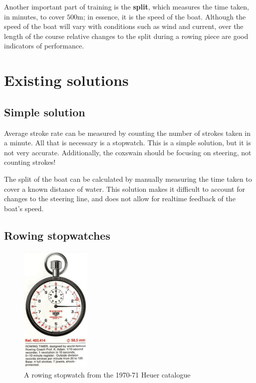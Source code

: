 \documentclass[11pt,twoside,a4paper]{report}
\begin{document}
Another important part of training is the \textbf{split}, which measures the time taken, in minutes, to cover $500\si{\metre}$; in essence, it is the speed of the boat. Although the speed of the boat will vary with conditions such as wind and current, over the length of the course relative changes to the split during a rowing piece are good indicators of performance.

\section{Existing solutions}

\subsection{Simple solution}

Average stroke rate can be measured by counting the number of strokes taken in a minute. All that is necessary is  a stopwatch. This is a simple solution, but it is not very accurate. Additionally, the coxswain should be focusing on steering, not counting strokes!

The split of the boat can be calculated by manually measuring the time taken to cover a known distance of water. This solution makes it difficult to account for changes to the steering line, and does not allow for realtime feedback of the boat's speed.

\subsection{Rowing stopwatches}

\begin{figure}[ht]
  \centering
  \includegraphics[width=0.3\textwidth]{rowing-stopwatch-heuer.jpg}
  \caption{A rowing stopwatch from the 1970-71 Heuer catalogue \cite{heuers_on_the_sea}}
  \label{fig:rowing-stopwatch-heuer}
\end{figure}
\end{document}
